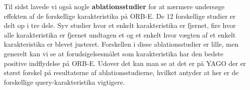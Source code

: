 \begin{multicols*}{2}
Til sidst lavede vi også nogle \textbf{ablationsstudier} for at nærmere undersøge effekten af de forskellige karakteristika på ORB-E. De 12 forskellige studier er delt op i tre dele. Syv studier hvor et enkelt karakteristika er fjernet, fire hvor alle karakteristika er fjernet undtagen et og et enkelt hvor vægten af et enkelt karakteristika er blevet justeret. Forskellen i disse ablationsstudier er lille, men generelt kan vi se at forudsigelsesmålet som karakteristika har den bedste positive indflydelse på ORB-E. Udover det kan man se at det er på YAGO der er størst forskel på resultaterne af ablationsstudierne, hvilket antyder at her er de forskellige query-karakteristika vigtigere.


\end{multicols*}